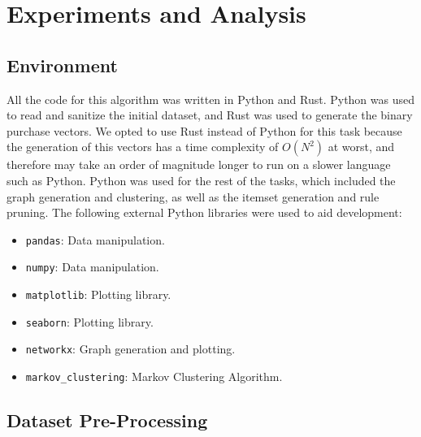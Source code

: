 \chapter{Experiments and Analysis}

\section{Environment}
All the code for this algorithm was written in Python and Rust. Python was used to read and sanitize the initial dataset, and Rust was used to generate the binary purchase vectors. We opted to use Rust instead of Python for this task because the generation of this vectors has a time complexity of $O(N^2)$ at worst, and therefore may take an order of magnitude longer to run on a slower language such as Python. Python was used for the rest of the tasks, which included the graph generation and clustering, as well as the itemset generation and rule pruning. The following external Python libraries were used to aid development:
\begin{itemize}
\item \texttt{pandas}: Data manipulation.
\item \texttt{numpy}: Data manipulation.
\item \texttt{matplotlib}: Plotting library.
\item \texttt{seaborn}: Plotting library.
\item \texttt{networkx}: Graph generation and plotting.
\item \texttt{markov\_clustering}: Markov Clustering Algorithm.
\end{itemize}


\section{Dataset Pre-Processing}

